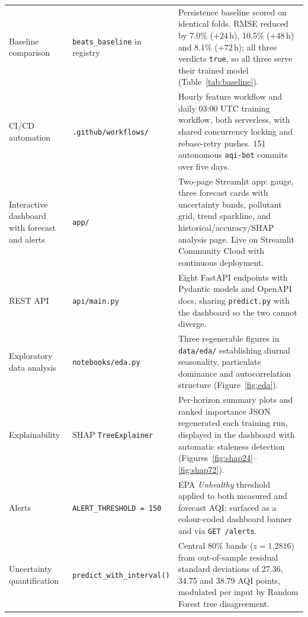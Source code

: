 \documentclass[11pt,a4paper]{article}
\begin{document}
\begin{longtable}{@{}p{2.9cm}p{3.6cm}p{7.6cm}@{}}
Baseline comparison
& \texttt{beats\_baseline} in registry
& Persistence baseline scored on identical folds. RMSE reduced by 7.0\%
($+24$\,h), 10.5\% ($+48$\,h) and 8.1\% ($+72$\,h); all three verdicts
\texttt{true}, so all three serve their trained model
(Table~\ref{tab:baseline}).\\
\addlinespace

CI/CD automation
& \texttt{.github/workflows/}
& Hourly feature workflow and daily 03:00 UTC training workflow, both
serverless, with shared concurrency locking and rebase-retry pushes. 151
autonomous \texttt{aqi-bot} commits over five days.\\
\addlinespace

Interactive dashboard with forecast and alerts
& \texttt{app/}
& Two-page Streamlit app: gauge, three forecast cards with uncertainty bands,
pollutant grid, trend sparkline, and historical/accuracy/SHAP analysis page.
Live on Streamlit Community Cloud with continuous deployment.\\
\addlinespace

REST API
& \texttt{api/main.py}
& Eight FastAPI endpoints with Pydantic models and OpenAPI docs, sharing
\texttt{predict.py} with the dashboard so the two cannot diverge.\\
\addlinespace

Exploratory data analysis
& \texttt{notebooks/eda.py}
& Three regenerable figures in \texttt{data/eda/} establishing diurnal
seasonality, particulate dominance and autocorrelation structure
(Figure~\ref{fig:eda}).\\
\addlinespace

Explainability
& SHAP \texttt{TreeExplainer}
& Per-horizon summary plots and ranked importance JSON regenerated each
training run, displayed in the dashboard with automatic staleness detection
(Figures~\ref{fig:shap24}--\ref{fig:shap72}).\\
\addlinespace

Alerts
& \texttt{ALERT\_THRESHOLD = 150}
& EPA \emph{Unhealthy} threshold applied to both measured and forecast AQI;
surfaced as a colour-coded dashboard banner and via \texttt{GET /alerts}.\\
\addlinespace

Uncertainty quantification
& \texttt{predict\_with\_interval()}
& Central 80\% bands ($z = 1.2816$) from out-of-sample residual standard
deviations of 27.36, 34.75 and 38.79 AQI points, modulated per input by
Random Forest tree disagreement.\\
\end{longtable}
\end{document}
